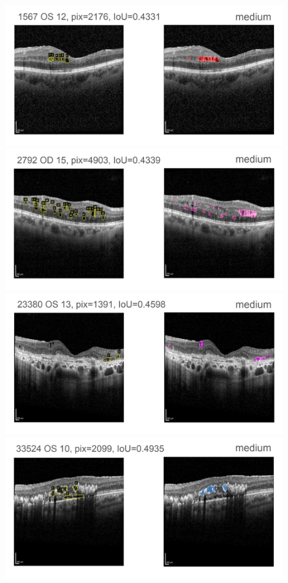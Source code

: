\includegraphics[width=0.9\textwidth]{./pic/Segmentierung/Segmentierungsergebnisse/9.PNG}
\includegraphics[width=0.9\textwidth]{./pic/Segmentierung/Segmentierungsergebnisse/10.PNG}
\includegraphics[width=0.9\textwidth]{./pic/Segmentierung/Segmentierungsergebnisse/11.PNG}
\includegraphics[width=0.9\textwidth]{./pic/Segmentierung/Segmentierungsergebnisse/12.PNG}
